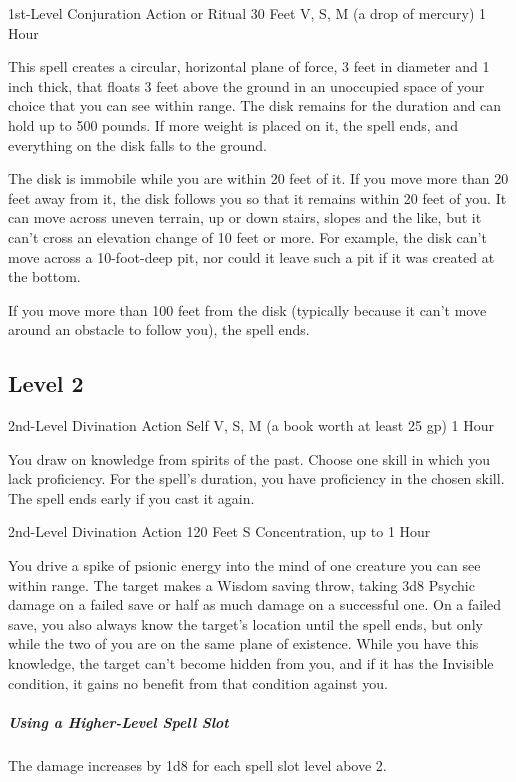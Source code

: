 \documentclass[letterpaper,openany,oneside,twocolumn]{book}
\begin{document}
	{1st-Level Conjuration}
	{Action or Ritual}
	{30 Feet}
	{V, S, M (a drop of mercury)}
	{1 Hour}

This spell creates a circular, horizontal plane of force, 3 feet in diameter and 1 inch thick, that floats 3 feet above the ground in an unoccupied space of your choice that you can see within range. The disk remains for the duration and can hold up to 500 pounds. If more weight is placed on it, the spell ends, and everything on the disk falls to the ground.

The disk is immobile while you are within 20 feet of it. If you move more than 20 feet away from it, the disk follows you so that it remains within 20 feet of you. It can move across uneven terrain, up or down stairs, slopes and the like, but it can't cross an elevation change of 10 feet or more. For example, the disk can't move across a 10-foot-deep pit, nor could it leave such a pit if it was created at the bottom.

If you move more than 100 feet from the disk (typically because it can't move around an obstacle to follow you), the spell ends.

\subsection*{Level 2}

	{2nd-Level Divination}
	{Action}
	{Self}
	{V, S, M (a book worth at least 25 gp)}
	{1 Hour}

You draw on knowledge from spirits of the past. Choose one skill in which you lack proficiency. For the spell's duration, you have proficiency in the chosen skill. The spell ends early if you cast it again.

	{2nd-Level Divination}
	{Action}
	{120 Feet}
	{S}
	{Concentration, up to 1 Hour}

You drive a spike of psionic energy into the mind of one creature you can see within range. The target makes a Wisdom saving throw, taking 3d8 Psychic damage on a failed save or half as much damage on a successful one. On a failed save, you also always know the target's location until the spell ends, but only while the two of you are on the same plane of existence. While you have this knowledge, the target can't become hidden from you, and if it has the Invisible condition, it gains no benefit from that condition against you.

\subparagraph*{Using a Higher-Level Spell Slot} The damage increases by 1d8 for each spell slot level above 2.
\end{document}
